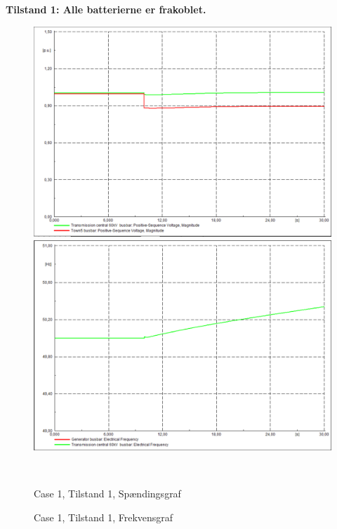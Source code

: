 \textbf{Tilstand 1: Alle batterierne er frakoblet.}
\begin{figure}[H]
	\centering
	\begin{minipage}[b]{0.48\textwidth}
		\centering
		\includegraphics[width=1.00\textwidth]{figurer/SmallDisturbance/Voltage1} %
	\end{minipage}
	\hfill
	\begin{minipage}[b]{0.48\textwidth}
		\centering
		\includegraphics[width=1.00\textwidth]{figurer/SmallDisturbance/Freq1} %
	\end{minipage}
	\\ %
	\begin{minipage}[t]{0.48\textwidth}
		\caption{Case 1, Tilstand 1, Spændingsgraf} %
		\label{fig:C1T1V}
	\end{minipage}
	\hfill
	\begin{minipage}[t]{0.48\textwidth}
		\caption{Case 1, Tilstand 1, Frekvensgraf} %
		\label{fig:C1T1F}
	\end{minipage}
\end{figure}

